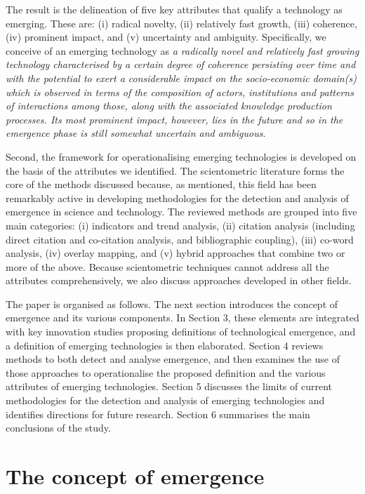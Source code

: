 \documentclass[11pt]{article}
\begin{document}
The result is the delineation of five key attributes that qualify a technology as emerging. These are: (i) radical novelty, (ii) relatively fast growth, (iii) coherence, (iv) prominent impact, and (v) uncertainty and ambiguity. Specifically, we conceive of an emerging technology as \textit{a radically novel and relatively fast growing technology characterised by a certain degree of coherence persisting over time and with the potential to exert a considerable impact on the socio-economic domain(s) which is observed in terms of the composition of actors, institutions and patterns of interactions among those, along with the associated knowledge production processes. Its most prominent impact, however, lies in the future and so in the emergence phase is still somewhat uncertain and ambiguous}. 

Second, the framework for operationalising emerging technologies is developed on the basis of the attributes we identified. The scientometric literature forms the core of the methods discussed because, as mentioned, this field has been remarkably active in developing methodologies for the detection and analysis of emergence in science and technology. The reviewed methods are grouped into five main categories: (i) indicators and trend analysis, (ii) citation analysis (including direct citation and co-citation analysis, and bibliographic coupling), (iii) co-word analysis, (iv) overlay mapping, and (v) hybrid approaches that combine two or more of the above. Because scientometric techniques cannot address all the attributes comprehensively, we also discuss approaches developed in other fields. 

The paper is organised as follows. The next section introduces the concept of emergence and its various components. In Section 3, these elements are integrated with key innovation studies proposing definitions of technological emergence, and a definition of emerging technologies is then elaborated. Section 4 reviews methods to both detect and analyse emergence, and then examines the use of those approaches to operationalise the proposed definition and the various attributes of emerging technologies. Section 5 discusses the limits of current methodologies for the detection and analysis of emerging technologies and identifies directions for future research. Section 6 summarises the main conclusions of the study.

\section{The concept of emergence}
\end{document}
